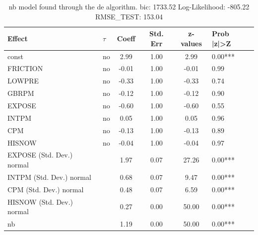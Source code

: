 \begin{table}
	\caption{nb model found through the de algorithm. bic: 1733.52 Log-Likelihood: -805.22 RMSE_TEST: 153.04}
	\begin{center}
		\begin{tabular}{|l|l|c|c|c|l|}
			\hline
			Effect & $\tau$ & Coeff & Std. Err & z-values & Prob |z|>Z \\
			\hline
			const & no & 2.99 & 1.00 & 2.99 & 0.00*** \\
			\hline
			FRICTION & no & -0.01 & 1.00 & -0.01 & 0.99 \\
			\hline
			LOWPRE & no & -0.33 & 1.00 & -0.33 & 0.74 \\
			\hline
			GBRPM & no & -0.12 & 1.00 & -0.12 & 0.90 \\
			\hline
			EXPOSE & no & -0.60 & 1.00 & -0.60 & 0.55 \\
			\hline
			INTPM & no & 0.05 & 1.00 & 0.05 & 0.96 \\
			\hline
			CPM & no & -0.13 & 1.00 & -0.13 & 0.89 \\
			\hline
			HISNOW & no & -0.04 & 1.00 & -0.04 & 0.97 \\
			\hline
			EXPOSE (Std. Dev.) normal &  & 1.97 & 0.07 & 27.26 & 0.00*** \\
			\hline
			INTPM (Std. Dev.) normal &  & 0.68 & 0.07 & 9.47 & 0.00*** \\
			\hline
			CPM (Std. Dev.) normal &  & 0.48 & 0.07 & 6.59 & 0.00*** \\
			\hline
			HISNOW (Std. Dev.) normal &  & 0.27 & 0.00 & 50.00 & 0.00*** \\
			\hline
			nb &  & 1.19 & 0.00 & 50.00 & 0.00*** \\
			\hline
		\end{tabular}
	\end{center}
\end{table}